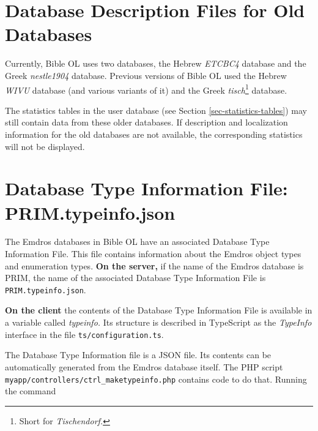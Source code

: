 \documentclass[11pt,oneside,a4paper]{memoir}
\begin{document}
\section{Database Description Files for Old Databases}\label{sec-old-db}

Currently, Bible OL uses two databases, the Hebrew \emph{ETCBC4} database and the Greek
\emph{nestle1904} database. Previous versions of Bible OL used the Hebrew \emph{WIVU}
database (and various variants of it) and the Greek \emph{tisch}\footnote{Short for
  \emph{Tischendorf.}} database.

The statistics tables in the user database (see Section
\ref{sec-statistics-tables}) may still contain data from these older databases. If description and
localization information for the old databases are not available, the corresponding statistics will
not be displayed.





\section{Database Type Information File: PRIM.typeinfo.json}\label{sec-tif}

The Emdros databases in Bible OL have an associated Database Type Information File. This file
contains information about the Emdros object types and
enumeration types. \textbf{On the server,} if the name of the Emdros
database is PRIM, the name of the associated Database Type Information File is
\texttt{PRIM.typeinfo.json}.

\textbf{On the client} the contents of the Database Type Information File is available in a variable
called \emph{typeinfo.}%
Its structure is described in TypeScript as the \emph{TypeInfo} interface%
in the file \texttt{ts/configuration.ts}.

The Database Type Information file is a JSON file. Its contents can be automatically generated from
the Emdros database itself. The PHP script \texttt{myapp/controllers/ctrl\_maketypeinfo.php}
contains code to do that. Running the command
\end{document}
